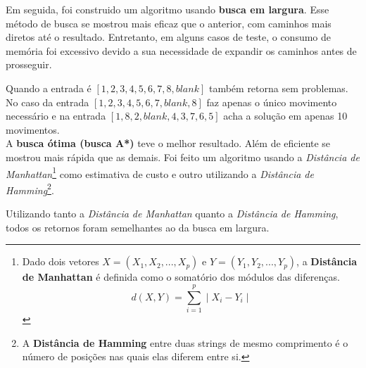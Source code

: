 \documentclass[12pt,a4paper]{article}
\begin{document}
Em seguida, foi construido um algoritmo usando \textbf{busca em largura}. Esse método de busca se mostrou mais eficaz que o anterior, com caminhos mais diretos até o resultado. Entretanto, em alguns casos de teste, o consumo de memória foi excessivo devido a sua necessidade de expandir os caminhos antes de prosseguir.

Quando a entrada é $[1,2,3,4,5,6,7,8,blank]$ também retorna sem problemas. No caso da entrada $[1,2,3,4,5,6,7,blank,8]$ faz apenas o único movimento necessário e na entrada $[1,8,2,blank,4,3,7,6,5]$ acha a solução em apenas 10 movimentos.
\\

A \textbf{busca ótima (busca A*)} teve o melhor resultado. Além de eficiente se mostrou mais rápida que as demais. Foi feito um algoritmo usando a \textit{Distância de Manhattan}\footnote{Dado dois vetores $X=(X_1,X_2,...,X_p)$ e $Y=(Y_1,Y_2,...,Y_p)$, a \textbf{Distância de Manhattan} é definida como o somatório dos módulos das diferenças. $$d(X,Y)= \sum_{i=1}^{p} \mid X_i - Y_i \mid$$} como estimativa de custo e outro utilizando a \textit{Distância de Hamming}\footnote{A \textbf{Distância de Hamming} entre duas strings de mesmo comprimento é o número de posições nas quais elas diferem entre si.}.

Utilizando tanto a \textit{Distância de Manhattan} quanto a \textit{Distância de Hamming}, todos os retornos foram semelhantes ao da busca em largura.
\end{document}
